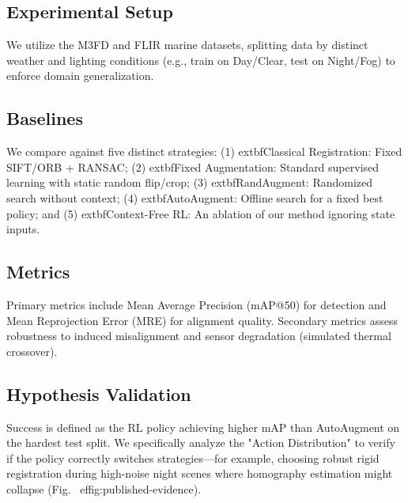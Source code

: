 \subsection{Experimental Setup}
We utilize the M3FD and FLIR marine datasets, splitting data by distinct weather and lighting conditions (e.g., train on Day/Clear, test on Night/Fog) to enforce domain generalization.

\subsection{Baselines}
We compare against five distinct strategies: (1) 	extbf{Classical Registration:} Fixed SIFT/ORB + RANSAC; (2) 	extbf{Fixed Augmentation:} Standard supervised learning with static random flip/crop; (3) 	extbf{RandAugment:} Randomized search without context; (4) 	extbf{AutoAugment:} Offline search for a fixed best policy; and (5) 	extbf{Context-Free RL:} An ablation of our method ignoring state inputs.

\subsection{Metrics}
Primary metrics include Mean Average Precision (mAP@50) for detection and Mean Reprojection Error (MRE) for alignment quality. Secondary metrics assess robustness to induced misalignment and sensor degradation (simulated thermal crossover).

\subsection{Hypothesis Validation}
Success is defined as the RL policy achieving higher mAP than AutoAugment on the hardest test split. We specifically analyze the "Action Distribution" to verify if the policy correctly switches strategies—for example, choosing robust rigid registration during high-noise night scenes where homography estimation might collapse (Fig.~
ef{fig:published-evidence}).
